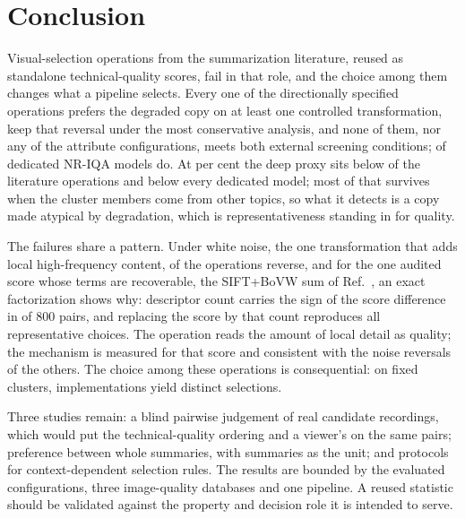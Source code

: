\section{Conclusion}\label{sec:conclusion}

Visual-selection operations from the summarization literature, reused as standalone
technical-quality scores, fail in that role, and the choice among them changes what a
pipeline selects. Every one of the \fontesDaLiteratura{} directionally
specified operations prefers the degraded copy on at least one controlled transformation,
\invOpsSigTop{} keep that reversal under the most conservative analysis, and none of them,
nor any of the \resCombinacoes{} attribute configurations, meets both external screening
conditions; \resElegiveis{} of \invModelos{} dedicated NR-IQA models do. At \taxCentPar{} per cent the deep proxy sits below \taxCentAbaixoDe{} of the \fontesDaLiteratura{} literature operations and below every dedicated model; most of that survives when the cluster members come from other topics, so what it detects is a copy made atypical by degradation, which is representativeness standing in for quality.

The failures share a pattern. Under white noise, the one transformation that adds local high-frequency content,
\resRuido{} of the \fontesDaLiteratura{} operations reverse, and for
the one audited score whose terms are recoverable, the SIFT+BoVW sum of Ref.~\citep{barbieri2021tese}, an exact factorization shows why: descriptor count carries the
sign of the score difference in \mecConcordam{} of 800 pairs, and replacing the score by
that count reproduces all \redEscolhas{} representative choices. The operation reads the
amount of local detail as quality; the mechanism is measured for that score and consistent
with the noise reversals of the others. The choice among these operations is consequential:
on \disClusters{} fixed clusters, \disOps{} implementations yield \disResumos{} distinct
selections.

 Three
studies remain: a blind pairwise judgement of real candidate recordings, which would put
the technical-quality ordering and a viewer's on the same pairs; preference between whole
summaries, with summaries as the unit; and protocols for context-dependent selection rules.
The results are bounded by the evaluated configurations, three image-quality databases and one pipeline. A reused statistic should be validated against the property and decision role it is intended to serve.
